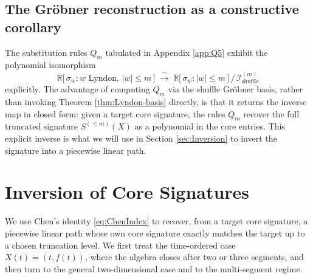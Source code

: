 \documentclass[12pt,english]{article}
\theoremstyle{remark}
\begin{document}
\subsection{The Gröbner reconstruction as a constructive corollary}

The substitution rules $Q_{m}$ tabulated in Appendix \ref{app:Q5}
exhibit the polynomial isomorphism
\[
\mathbb{R}\bigl[\,\sigma_{w}:w\text{ Lyndon},\,|w|\leq m\,\bigr]\;\xrightarrow{\;\sim\;}\;\mathbb{R}\bigl[\,\sigma_{w}:|w|\leq m\,\bigr]\,\big/\,\mathcal{I}_{\text{shuffle}}^{(m)}
\]
explicitly. The advantage of computing $Q_{m}$ via the shuffle Gröbner
basis, rather than invoking Theorem \ref{thm:Lyndon-basis} directly,
is that it returns the inverse map in closed form: given a target
core signature, the rules $Q_{m}$ recover the full truncated signature
$S^{(\leq m)}(X)$ as a polynomial in the core entries. This explicit
inverse is what we will use in Section \ref{sec:Inversion} to invert
the signature into a piecewise linear path.

\section{Inversion of Core Signatures\label{sec:Inversion}}

We use Chen's identity \eqref{eq:ChenIndex} to recover, from a target
core signature, a piecewise linear path whose own core signature exactly
matches the target up to a chosen truncation level. We first treat
the time-ordered case $X(t)=(t,f(t))$, where the algebra closes after
two or three segments, and then turn to the general two-dimensional
case and to the multi-segment regime.
\end{document}
